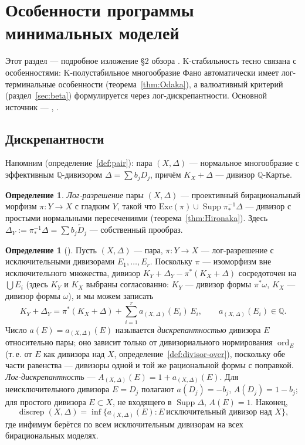 \documentclass[11pt,a4paper]{article}
\theoremstyle{plain}
\theoremstyle{definition}
\newtheorem{definition}[theorem]{Определение}
\theoremstyle{remark}
\newcommand{\Q}{\mathbb{Q}}
\DeclareMathOperator{\ord}{ord}
\DeclareMathOperator{\discrep}{discrep}
\DeclareMathOperator{\Supp}{Supp}
\begin{document}
\section{Особенности программы минимальных моделей}\label{sec:mmp}

Этот раздел --- подробное изложение \S2 обзора \cite{DeV}. K-стабильность тесно
связана с особенностями: K-полустабильное многообразие Фано автоматически имеет лог-терминальные
особенности (теорема~\ref{thm:Odaka}), а валюативный критерий (раздел~\ref{sec:beta}) формулируется
через лог-дискрепантности. Основной источник --- \cite[\S\,2.3]{KM}, \cite{KolSing}.

\subsection{Дискрепантности}

Напомним (определение~\ref{def:pair}): пара $(X,\Delta)$ --- нормальное многообразие с эффективным
$\Q$-дивизором $\Delta=\sum b_jD_j$, причём $K_X+\Delta$ --- дивизор $\Q$-Картье.

\begin{definition}\label{def:logres}
\emph{Лог-разрешение} пары $(X,\Delta)$ --- проективный бирациональный морфизм
$\pi\colon Y\to X$ с гладким $Y$, такой что $\mathrm{Exc}(\pi)\cup\Supp\pi^{-1}_*\Delta$ ---
дивизор с простыми нормальными пересечениями (теорема~\ref{thm:Hironaka}). Здесь
$\Delta_Y:=\pi^{-1}_*\Delta=\sum b_j\tilde D_j$ --- собственный прообраз.
\end{definition}

\begin{definition}[{\cite[2.25--2.28]{KM}}]\label{def:discrep}
Пусть $(X,\Delta)$ --- пара, $\pi\colon Y\to X$ --- лог-разрешение с исключительными дивизорами
$E_1,\dots,E_r$. Поскольку $\pi$ --- изоморфизм вне исключительного множества, дивизор
$K_Y+\Delta_Y-\pi^*(K_X+\Delta)$ сосредоточен на $\bigcup E_i$ (здесь $K_Y$ и $K_X$ выбраны
согласованно: $K_Y$ --- дивизор формы $\pi^*\omega$, $K_X$ --- дивизор формы $\omega$), и мы можем
записать
\[
K_Y+\Delta_Y=\pi^*(K_X+\Delta)+\sum_{i=1}^ra_{(X,\Delta)}(E_i)\,E_i,\qquad a_{(X,\Delta)}(E_i)\in\Q .
\]
Число $a(E)=a_{(X,\Delta)}(E)$ называется \emph{дискрепантностью} дивизора $E$ относительно
пары; оно зависит только от дивизориального нормирования $\ord_E$ (т.\,е. от $E$ как дивизора над
$X$, определение~\ref{def:divisor-over}), поскольку обе части равенства --- дивизоры одной и той же
рациональной формы с поправкой. \emph{Лог-дискрепантность} --- $A_{(X,\Delta)}(E)=1+a_{(X,\Delta)}(E)$.
Для неисключительного дивизора $E=D_j$ полагают $a(D_j)=-b_j$, $A(D_j)=1-b_j$; для простого
дивизора $E\subset X$, не входящего в $\Supp\Delta$, $A(E)=1$. Наконец,
\[
\discrep(X,\Delta)=\inf\{a_{(X,\Delta)}(E):E\ \text{исключительный дивизор над }X\},
\]
где инфимум берётся по всем исключительным дивизорам на всех бирациональных моделях.
\end{definition}
\end{document}

